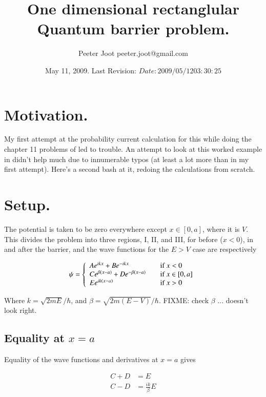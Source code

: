 \documentclass{article}
\title{ One dimensional rectanglular Quantum barrier problem. }
\author{Peeter Joot \quad peeter.joot@gmail.com }
\date{ May 11, 2009.  Last Revision: $Date: 2009/05/12 03:30:25 $ }
\begin{document}
\maketitle{}
\tableofcontents
\section{ Motivation. }

My first attempt at the probability current calculation for this
while doing the chapter 11 problems of \cite{bohm1989qt} led to trouble.
An attempt to look at this worked example in \cite{mcmahon2005qmd} didn't 
help much due to innumerable typos (at least a lot more than in my first attempt).
Here's a second bash at it, redoing the calculations from scratch.

\section{ Setup. }

The potential is taken to be zero everywhere except $x \in [0,a]$, where it is
$V$.  This divides the problem into three regions, I, II, and III, for 
before ($x<0$), in and after the barrier, and the wave functions for the 
$E >V$ case are respectively

\begin{equation}
\psi =
\left\{
\begin{array}{l l}
A e^{i k x} + B e^{-i k x} & \quad \mbox{if $x <0$} \\
C e^{ \beta(x-a)} + D e^{ -\beta(x-a)} & \quad \mbox{if $x \in [0,a]$} \\
E e^{i k(x-a)} & \quad \mbox{if $x >0$} \\
\end{array}
\right.
\end{equation}

Where $k = \sqrt{2 m E}/\hbar$, and $\beta = \sqrt{2 m (E-V)}/\hbar$.
FIXME: check $\beta$ ... doesn't look right.

\subsection{ Equality at $x=a$ }

Equality of the wave functions and derivatives at $x=a$ gives

\begin{align*}
C + D &= E \\
C - D &= \frac{i k}{\beta}E
\end{align*}
\end{document}
